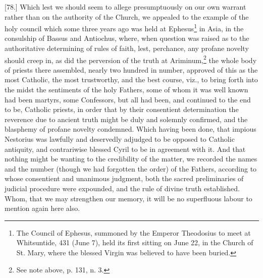 [78.] Which lest we should seem to allege presumptuously on our own warrant rather than on the authority of the Church, we appealed to the example of the holy council which some three years ago was held at Ephesus\footnote{The Council of Ephesus, summoned by the Emperor Theodosius to meet at Whitsuntide, 431 (June 7), held its first sitting on June 22, in the Church of St. Mary, where the blessed Virgin was believed to have been buried.} in Asia, in the consulship of Bassus and Antiochus, where, when question was raised as to the authoritative determining of rules of faith, lest, perchance, any profane novelty should creep in, as did the perversion of the truth at Ariminum,\footnote{See note above, p. 131, n. 3.} the whole body of priests there assembled, nearly two hundred in number, approved of this as the most Catholic, the most trustworthy, and the best course, viz., to bring forth into the midst the sentiments of the holy Fathers, some of whom it was well known had been martyrs, some Confessors, but all had been, and continued to the end to be, Catholic priests, in order that by their consentient determination the reverence due to ancient truth might be duly and solemnly confirmed, and the blasphemy of profane novelty condemned. Which having been done, that impious Nestorius was lawfully and deservedly adjudged to be opposed to Catholic antiquity, and contrariwise blessed Cyril to be in agreement with it. And that nothing might be wanting to the credibility of the matter, we recorded the names and the number (though we had forgotten the order) of the Fathers, according to whose consentient and unanimous judgment, both the sacred preliminaries of judicial procedure were expounded, and the rule of divine truth established. Whom, that we may strengthen our memory, it will be no superfluous labour to mention again here also.


